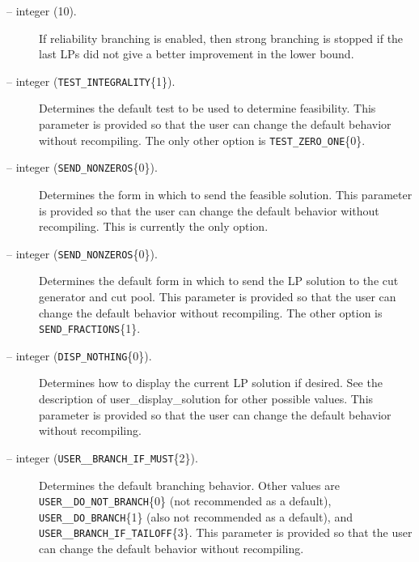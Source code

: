 \begin{description}
\item[ -- integer (10).] 
If reliability branching is enabled, then strong branching is stopped if the
last  LPs did not give a better improvement in
the lower bound.


\item[ -- integer ({\tt TEST\_INTEGRALITY}\{1\}).]
Determines the default test to be used to determine feasibility. This
parameter is provided so that the user can change the default behavior
without recompiling. The only other option is {\tt TEST\_ZERO\_ONE}\{0\}.

\item[ -- integer 
({\tt SEND\_NONZEROS}\{0\}).] 
Determines the form in which to send the feasible solution. This
parameter is provided so that the user can change the default behavior
without recompiling. This is currently the only option.

\item[ -- integer ({\tt SEND\_NONZEROS}\{0\}).] 
Determines the default form in which to send the LP solution to the
cut generator and cut pool. This
parameter is provided so that the user can change the default behavior
without recompiling. The other option is {\tt SEND\_FRACTIONS}\{1\}.

\item[ -- integer ({\tt DISP\_NOTHING}\{0\}).] 
Determines how to display the current LP solution if desired.
See the description of 
{user_display_solution} for other
possible values. This parameter is provided so that
the user can change the default behavior without recompiling.

\item[ -- integer 
({\tt USER\_\_BRANCH\_IF\_MUST}\{2\}).] 
Determines the default branching behavior. Other values are {\tt
USER\_\_DO\_NOT\_BRANCH}\{0\} (not recommended as a default), {\tt
USER\_\_DO\_BRANCH}\{1\} (also not recommended as a default), and {\tt
USER\_\_BRANCH\_IF\_TAILOFF}\{3\}. This
parameter is provided so that the user can change the default behavior
without recompiling.


\end{description}
